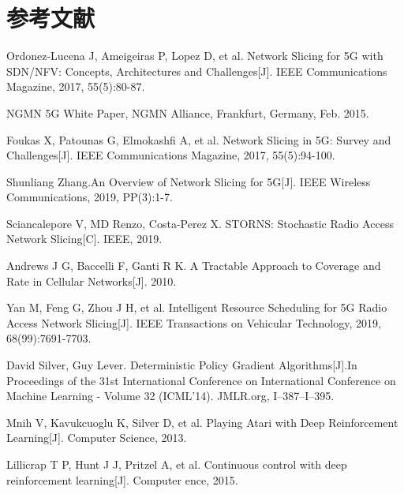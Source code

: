 \section{参考文献}
    \item Ordonez-Lucena J, Ameigeiras P, Lopez D, et al. Network Slicing for 5G with SDN/NFV: Concepts, Architectures and Challenges[J]. IEEE Communications Magazine, 2017, 55(5):80-87.
    \item NGMN 5G White Paper, NGMN Alliance, Frankfurt, Germany, Feb. 2015.
    \item Foukas X, Patounas G, Elmokashfi A, et al. Network Slicing in 5G: Survey and Challenges[J]. IEEE Communications Magazine, 2017, 55(5):94-100.
    \item Shunliang Zhang.An Overview of Network Slicing for 5G[J]. IEEE Wireless Communications, 2019, PP(3):1-7.
    \item Sciancalepore V, MD Renzo, Costa-Perez X. STORNS: Stochastic Radio Access Network Slicing[C]. IEEE, 2019.
    \item Andrews J G, Baccelli F, Ganti R K. A Tractable Approach to Coverage and Rate in Cellular Networks[J]. 2010.
    \item Yan M, Feng G, Zhou J H, et al. Intelligent Resource Scheduling for 5G Radio Access Network Slicing[J]. IEEE Transactions on Vehicular Technology, 2019, 68(99):7691-7703.
    \item David Silver, Guy Lever. Deterministic Policy Gradient Algorithms[J].In Proceedings of the 31st International Conference on International Conference on Machine Learning - Volume 32 (ICML'14). JMLR.org, I–387–I–395.
    \item Mnih V, Kavukcuoglu K, Silver D, et al. Playing Atari with Deep Reinforcement Learning[J]. Computer Science, 2013.
    \item Lillicrap T P, Hunt J J, Pritzel A, et al. Continuous control with deep reinforcement learning[J]. Computer ence, 2015.
    
